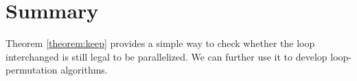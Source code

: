 








\section{Summary}

Theorem \ref{theorem:keep} provides a simple way to check whether the
loop interchanged is still legal to be parallelized. We can further
use it to develop loop-permutation algorithms.

